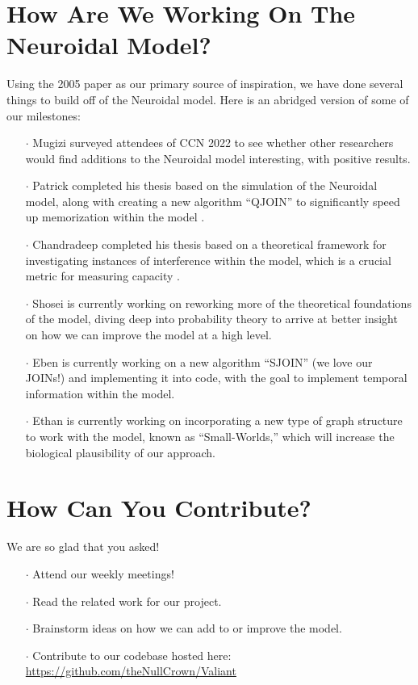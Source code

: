 \documentclass{article}
\begin{document}
\section*{How Are We Working On The Neuroidal Model?}

Using the 2005 paper as our primary source of inspiration, we have done several things to build off of the Neuroidal model. Here is an abridged version of some of our milestones:

\begin{itemize}
\item[$\cdot$]Mugizi surveyed attendees of CCN 2022 to see whether other researchers would find additions to the Neuroidal model interesting, with positive results.
\item[$\cdot$]Patrick completed his thesis based on the simulation of the Neuroidal model, along with creating a new algorithm ``QJOIN'' to significantly speed up memorization within the model \cite{perrine2023}.
\item[$\cdot$]Chandradeep completed his thesis based on a theoretical framework for investigating instances of interference within the model, which is a crucial metric for measuring capacity \cite{chowdhury2023}.
\item[$\cdot$]Shosei is currently working on reworking more of the theoretical foundations of the model, diving deep into probability theory to arrive at better insight on how we can improve the model at a high level.
\item[$\cdot$]Eben is currently working on a new algorithm ``SJOIN'' (we love our JOINs!) and implementing it into code, with the goal to implement temporal information within the model.
\item[$\cdot$]Ethan is currently working on incorporating a new type of graph structure to work with the model, known as ``Small-Worlds,'' which will increase the biological plausibility of our approach.
\end{itemize}

\newpage

\section*{How Can You Contribute?}

We are so glad that you asked!

\begin{itemize}
\item[$\cdot$]Attend our weekly meetings!
\item[$\cdot$]Read the related work for our project.
\item[$\cdot$]Brainstorm ideas on how we can add to or improve the model.
\item[$\cdot$]Contribute to our codebase hosted here: \url{https://github.com/theNullCrown/Valiant}
\end{itemize} 
\end{document}
